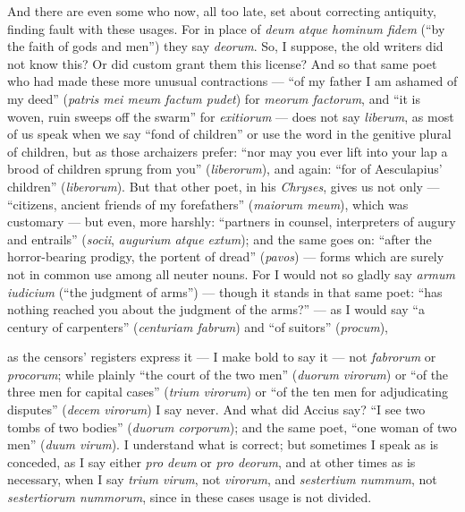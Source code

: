  And there are even some who now, all too late, set about correcting antiquity, finding fault with these usages. For in place of \textit{deum atque hominum fidem} (``by the faith of gods and men'') they say \textit{deorum}. So, I suppose, the old writers did not know this? Or did custom grant them this license? And so that same poet who had made these more unusual contractions — ``of my father I am ashamed of my deed'' (\textit{patris mei meum factum pudet}) for \textit{meorum factorum}, and ``it is woven, ruin sweeps off the swarm'' for \textit{exitiorum} — does not say \textit{liberum}, as most of us speak when we say ``fond of children'' or use the word in the genitive plural of children, but as those archaizers prefer: ``nor may you ever lift into your lap a brood of children sprung from you'' (\textit{liberorum}), and again: ``for of Aesculapius' children'' (\textit{liberorum}). But that other poet, in his \textit{Chryses}, gives us not only — ``citizens, ancient friends of my forefathers'' (\textit{maiorum meum}), which was customary — but even, more harshly: ``partners in counsel, interpreters of augury and entrails'' (\textit{socii}, \textit{augurium atque extum}); and the same goes on: ``after the horror-bearing prodigy, the portent of dread'' (\textit{pavos}) — forms which are surely not in common use among all neuter nouns. For I would not so gladly say \textit{armum iudicium} (``the judgment of arms'') — though it stands in that same poet: ``has nothing reached you about the judgment of the arms?'' — as I would say ``a century of carpenters'' (\textit{centuriam fabrum}) and ``of suitors'' (\textit{procum}),

 as the censors' registers express it — I make bold to say it — not \textit{fabrorum} or \textit{procorum}; while plainly ``the court of the two men'' (\textit{duorum virorum}) or ``of the three men for capital cases'' (\textit{trium virorum}) or ``of the ten men for adjudicating disputes'' (\textit{decem virorum}) I say never. And what did Accius say? ``I see two tombs of two bodies'' (\textit{duorum corporum}); and the same poet, ``one woman of two men'' (\textit{duum virum}). I understand what is correct; but sometimes I speak as is conceded, as I say either \textit{pro deum} or \textit{pro deorum}, and at other times as is necessary, when I say \textit{trium virum}, not \textit{virorum}, and \textit{sestertium nummum}, not \textit{sestertiorum nummorum}, since in these cases usage is not divided.

